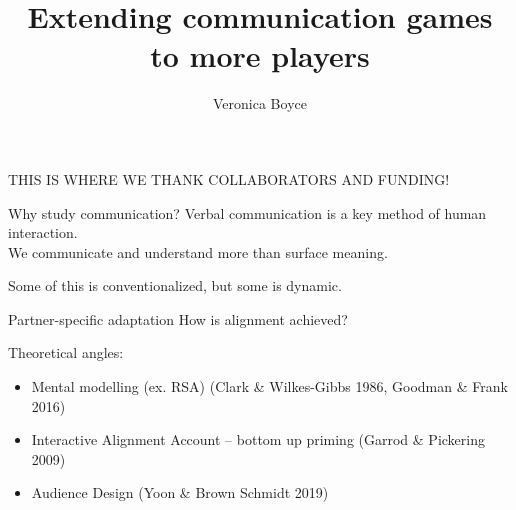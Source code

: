 \documentclass[ 12pt, xcolor=beamer,table,usenames,dvipsnames, ignorenonframetext, ngerman]{beamer}
\title{Extending communication games to more players}
\author{Veronica Boyce}
\begin{document}
\begin{frame}
\maketitle

\end{frame}

\begin{frame}
	THIS IS WHERE WE THANK COLLABORATORS AND FUNDING!
\end{frame}


\begin{frame}{Why study communication?}
	\pause
	Verbal communication is a key method of human interaction.\\ \pause
	We communicate and understand more than surface meaning.\\ \pause
	
	Some of this is conventionalized, but some is dynamic. \\
	
	
\end{frame}

\begin{frame}{Partner-specific adaptation}
	\pause
	How is alignment achieved? 
	
	\pause
	Theoretical angles: \pause
	\begin{itemize} 
		\item Mental modelling (ex. RSA) (Clark \& Wilkes-Gibbs 1986, Goodman \& Frank 2016) \pause
		\item Interactive Alignment Account -- bottom up priming (Garrod \& Pickering 2009) \pause
		\item Audience Design (Yoon \& Brown Schmidt 2019)
	\end{itemize}
\end{frame}
\end{document}

